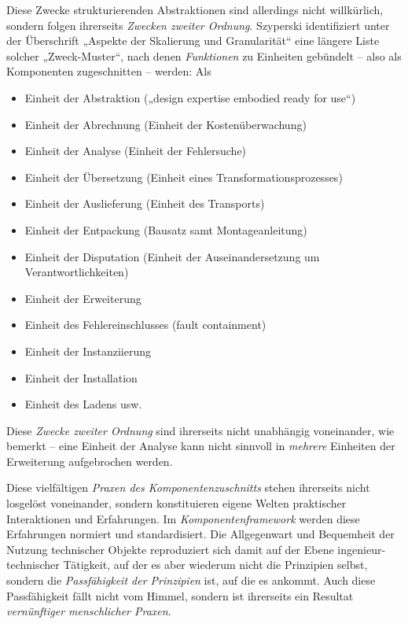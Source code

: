 \documentclass[12pt,a4paper]{article}
\begin{document}
Diese Zwecke strukturierenden Abstraktionen sind allerdings nicht willkürlich,
sondern folgen ihrerseits \emph{Zwecken zweiter Ordnung}.  Szyperski
\cite[S. 139\,ff.]{Szyperski2002} identifiziert unter der Überschrift „Aspekte
der Skalierung und Granularität“ eine längere Liste solcher „Zweck-Muster“,
nach denen \emph{Funktionen} zu Einheiten gebündelt -- also als Komponenten
zugeschnitten -- werden: Als
\begin{itemize}\itemsep0pt
\item Einheit der Abstraktion („design expertise embodied ready for use“)
\item Einheit der Abrechnung (Einheit der Kostenüberwachung)
\item Einheit der Analyse (Einheit der Fehlersuche)
\item Einheit der Übersetzung (Einheit eines Transformationsprozesses)
\item Einheit der Auslieferung (Einheit des Transports)
\item Einheit der Entpackung (Bausatz samt Montageanleitung)
\item Einheit der Disputation (Einheit der Auseinandersetzung um
  Verantwortlichkeiten) 
\item Einheit der Erweiterung 
\item Einheit des Fehlereinschlusses (fault containment)
\item Einheit der Instanziierung
\item Einheit der Installation
\item Einheit des Ladens usw.
\end{itemize}
Diese \emph{Zwecke zweiter Ordnung} sind ihrerseits nicht unabhängig
voneinander, wie \cite[S. 145]{Szyperski2002} bemerkt -- eine Einheit der
Analyse kann nicht sinnvoll in \emph{mehrere} Einheiten der Erweiterung
aufgebrochen werden.

Diese vielfältigen \emph{Praxen des Komponentenzuschnitts} stehen ihrerseits
nicht losgelöst voneinander, sondern konstituieren eigene Welten praktischer
Interaktionen und Erfahrungen. Im \emph{Komponentenframework} werden diese
Erfahrungen normiert und standardisiert.  Die Allgegenwart und Bequemheit der
Nutzung technischer Objekte reproduziert sich damit auf der Ebene
ingenieur-technischer Tätigkeit, auf der es aber wiederum nicht die Prinzipien
selbst, sondern die \emph{Passfähigkeit der Prinzipien} ist, auf die es
ankommt.  Auch diese Passfähigkeit fällt nicht vom Himmel, sondern ist
ihrerseits ein Resultat \emph{vernünftiger menschlicher Praxen}.
\end{document}
